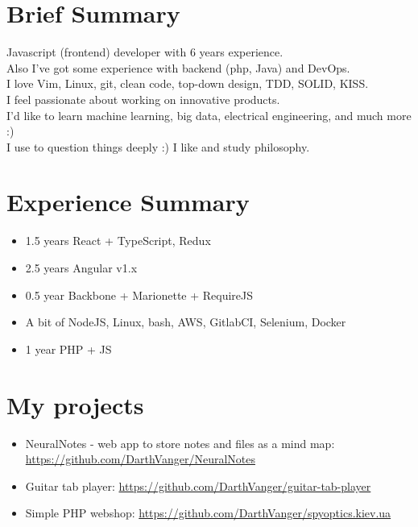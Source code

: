 \documentclass[a4paper, 14pt]{article}
\begin{document}
\begin{center}
	\textsc{\Huge{}}
\end{center}


\section{Brief Summary}
  Javascript (frontend) developer with 6 years experience.  \\
  Also I've got some experience with backend (php, Java) and DevOps.  \\
  I love Vim, Linux, git, clean code, top-down design, TDD, SOLID, KISS. \\
  I feel passionate about working on innovative products. \\
  I'd like to learn machine learning, big data, electrical engineering, and much more :) \\
  I use to question things deeply :) I like and study philosophy. \\

\section{Experience Summary}
  \begin{itemize}
    \item 1.5 years React + TypeScript, Redux \\
    \item 2.5 years Angular v1.x \\ 
    \item 0.5 year Backbone + Marionette + RequireJS \\ 
    \item A bit of NodeJS, Linux, bash, AWS, GitlabCI, Selenium, Docker \\
    \item 1 year PHP + JS
  \end{itemize}

\section{My projects}
  \begin{itemize}
    \item NeuralNotes - web app to store notes and files as a mind map: \url{https://github.com/DarthVanger/NeuralNotes} \\
    \item Guitar tab player: \url{https://github.com/DarthVanger/guitar-tab-player} \\
    \item Simple PHP webshop: \url{https://github.com/DarthVanger/spyoptics.kiev.ua} \\
  \end{itemize}
\end{document}
